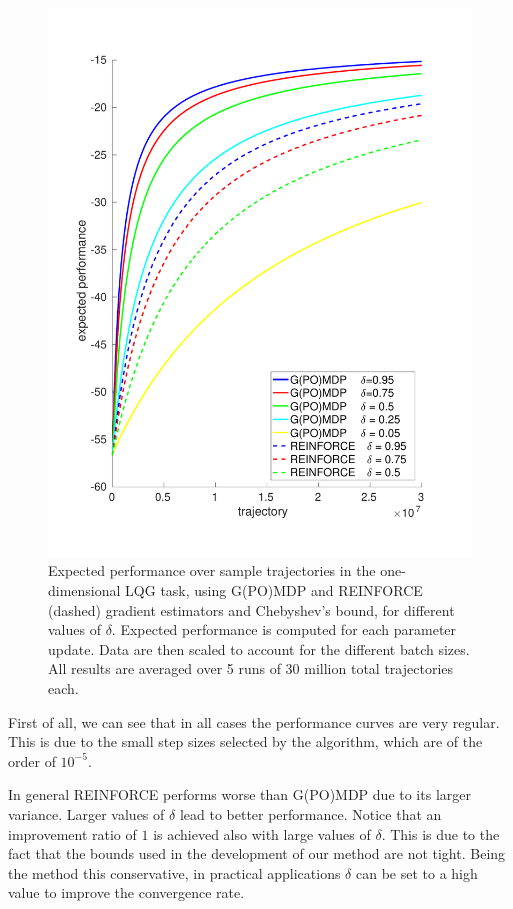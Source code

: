 \begin{figure}[t!]
\includegraphics[width = \textwidth]{Images/chebyshev.pdf}
\caption[Expected performance over sample trajectories in the one-dimensional LQG task for different gradient estimators ad values of $\delta$.]{Expected performance over sample trajectories in the one-dimensional \ac{LQG} task, using G(PO)MDP and REINFORCE (dashed) gradient estimators and Chebyshev's bound, for different values of $\delta$. Expected performance is computed for each parameter update. Data are then scaled to account for the different batch sizes. All results are averaged over 5 runs of 30 million total trajectories each.}
\label{fig:1}
\end{figure}

First of all, we can see that in all cases the performance curves are very regular. This is due to the small step sizes selected by the algorithm, which are of the order of $10^{-5}$.

In general REINFORCE performs worse than G(PO)MDP due to its larger variance.
Larger values of $\delta$  lead to better performance. Notice that an improvement ratio of $1$ is achieved also with large values of $\delta$. This is due to the fact that the bounds used in the development of our method are not tight. Being the method this conservative, in practical applications $\delta$ can be set to a high value to improve the convergence rate.

